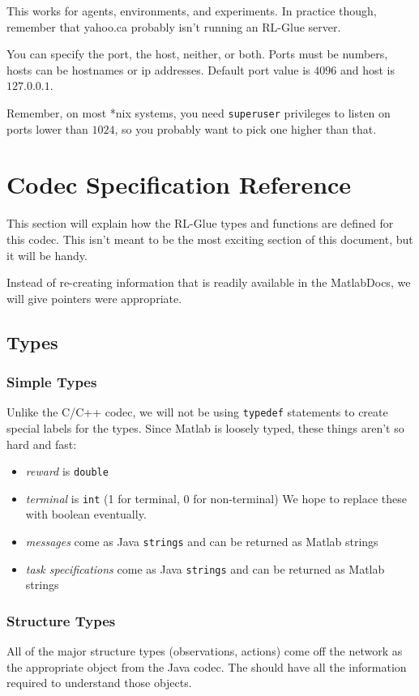 \documentclass[11pt]{article}
\begin{document}
This works for agents, environments, and experiments.  In practice though, remember that yahoo.ca probably isn't running an RL-Glue server.

You can specify the port, the host, neither, or both.  Ports must be numbers, hosts can be hostnames or ip addresses. Default port value is $4096$ and host is $127.0.0.1$.

Remember, on most *nix systems, you need \texttt{superuser} privileges to listen on ports lower than $1024$, so you probably want to pick one higher than that.

\section{Codec Specification Reference}
This section will explain how the RL-Glue types and functions are defined for this codec.  This isn't meant to be the most exciting section of this document, but it will
be handy.

Instead of re-creating information that is readily available in the MatlabDocs, we will give pointers were appropriate.

\subsection{Types}


\subsubsection{Simple Types}
Unlike the C/C++ codec, we will not be using \texttt{typedef} statements to create special labels for the types. Since Matlab is loosely typed, these things aren't so hard and 
fast:
\begin{itemize}
	\item \textit{reward} is \texttt{double}
	\item \textit{terminal} is \texttt{int} (1 for terminal, 0 for non-terminal) We hope to replace these with boolean eventually.
	\item \textit{messages} come as Java \texttt{strings} and can be returned as Matlab strings
	\item \textit{task specifications} come as Java \texttt{strings} and can be returned as Matlab strings
\end{itemize}

\def\rat{RL\_Abstract\_Type}

\subsubsection{Structure Types}
\label{sec:structure-types}
All of the major structure types (observations, actions) come off the network as the appropriate object from the Java codec.
The  should have all the information required to understand those objects.
\end{document}
